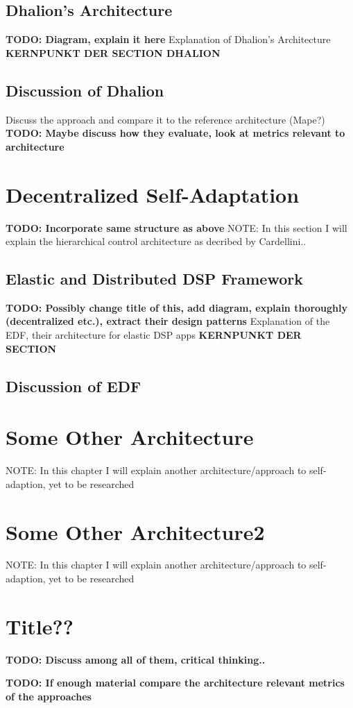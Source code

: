         \subsection{Dhalion's Architecture}
        \label{sec:dhalion-architecture}
        \textbf{TODO: Diagram, explain it here}
        Explanation of Dhalion's Architecture \textbf{KERNPUNKT DER SECTION DHALION}

        \subsection{Discussion of Dhalion}
        \label{sec:dhalion-discussion}
        Discuss the approach and compare it to the reference architecture (Mape?)
        \textbf{TODO: Maybe discuss how they evaluate, look at metrics relevant to architecture}

    \section{Decentralized Self-Adaptation}
    \label{sec:hierarchical}
    \textbf{TODO: Incorporate same structure as above}
    NOTE: In this section I will explain the hierarchical control architecture as decribed by Cardellini..

        \subsection{Elastic and Distributed DSP Framework}
        \label{sec:edf}
        \textbf{TODO: Possibly change title of this, add diagram, explain thoroughly (decentralized etc.), extract their design patterns}
        Explanation of the EDF, their architecture for elastic DSP apps \textbf{KERNPUNKT DER SECTION}

        \subsection{Discussion of EDF}
        \label{sec:discussion-edf}

    \section{Some Other Architecture}
    \label{sec:soa}
    NOTE: In this chapter I will explain another architecture/approach to self-adaption, yet to be researched


    \section{Some Other Architecture2}
    \label{sec:soa2}
    NOTE: In this chapter I will explain another architecture/approach to self-adaption, yet to be researched


    \section{Title??}
    \textbf{TODO: Discuss among all of them, critical thinking..}

    \textbf{TODO: If enough material compare the architecture relevant metrics of the approaches}